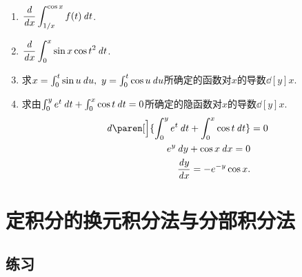 \documentclass[a4paper,punct=CCT]{ctexbook}
\theoremstyle{break}
\newif\ifshowsol
\newif\ifshowex
\begin{document}
\begin{enumerate}
\item \(\displaystyle \frac{\mathop{}\!\mathit{d}}{\mathop{}\!\mathit{d} x} \int_{1/x}^{\cos x} f(t) \mathop{}\!\mathit{d} t\).

  \ifshowsol
  \[
    \ddx \int_{1/x}^{\cos x} f(t) \dt
    = \ddx \paren[\Big]{\int_{1/x}^0 f(t) \dt + \int_0^{\cos x} f(t) \dt}
    = \frac{f(1/x)}{x^2} - f(\cos x) \sin x .
  \]
  \fi

\item \(\displaystyle \frac{\mathop{}\!\mathit{d}}{\mathop{}\!\mathit{d} x} \int_0^x \sin x \cos t^2 \mathop{}\!\mathit{d} t\).

  \ifshowsol
  \[
    \ddx \int_0^x \sin x \cos t^2 \dt
    = \ddx \sin x \int_0^x \cos t^2 \dt
    = \cos x \int_0^x \cos t^2 \dt + \sin x \cos x^2.
  \]
  \fi

\item 求\(x = \int_0^t \sin u \mathop{}\!\mathit{d} u,\ y = \int_0^t \cos u \mathop{}\!\mathit{d} u\)所确定的函数对\(x\)的导数\(\dd[y]x\).

  \ifshowsol
  \[
    \dd[y]x = \frac{\dy/\!\dt}{\dx/\!\dt}
    = \frac{\cos t}{\sin t}
    = \cot t.
  \]
  \fi

\item 求由\(\int_0^y e^t \mathop{}\!\mathit{d} t + \int_0^x \cos t \mathop{}\!\mathit{d} t = 0\)所确定的隐函数对\(x\)的导数\(\dd[y]x\).
  \[
    \begin{split}
      \diff\paren[\Big]{\int_0^y e^t \dt + \int_0^x \cos t \dt}
      &= 0 \\
      e^y \dy + \cos x \dx = 0 \\
      \dd[y]x = - e^{-y} \cos x.
    \end{split}
  \]
\end{enumerate}
\fi

\section{定积分的换元积分法与分部积分法}

\ifshowex
{}
\subsection*{练习}
\end{document}

